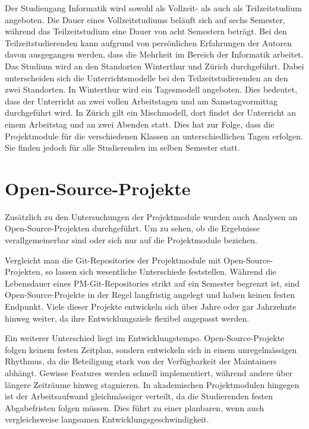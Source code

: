 Der Studiengang Informatik wird sowohl als Vollzeit- als auch als Teilzeitstudium angeboten. Die Dauer eines Vollzeitstudiums beläuft sich auf sechs Semester, während das Teilzeitstudium eine Dauer von acht Semestern beträgt. Bei den Teilzeitstudierenden kann aufgrund von persönlichen Erfahrungen der Autoren davon ausgegangen werden, dass die Mehrheit im Bereich der Informatik arbeitet. Das Studium wird an den Standorten Winterthur und Zürich durchgeführt. Dabei unterscheiden sich die Unterrichtsmodelle bei den Teilzeitstudierenden an den zwei Standorten. In Winterthur wird ein Tagesmodell angeboten. Dies bedeutet, dass der Unterricht an zwei vollen Arbeitstagen und am Samstagvormittag durchgeführt wird. In Zürich gilt ein Mischmodell, dort findet der Unterricht an einem Arbeitstag und an zwei Abenden statt. Dies hat zur Folge, dass die Projektmodule für die verschiedenen Klassen an unterschiedlichen Tagen erfolgen. Sie finden jedoch für alle Studierenden im selben Semester statt. \parencite{noauthor_bachelorstudium_nodate}\parencite{noauthor_teilzeitstudium_nodate}

\section{Open-Source-Projekte}
\label{sec:OpenSourceProjekte}
Zusätzlich zu den Untersuchungen der Projektmodule wurden auch Analysen an Open-Source-Projekten durchgeführt. Um zu sehen, ob die Ergebnisse verallgemeinerbar sind oder sich nur auf die Projektmodule beziehen.

Vergleicht man die Git-Repositories der Projektmodule mit Open-Source-Projekten, so lassen sich wesentliche Unterschiede feststellen. Während die Lebensdauer eines PM-Git-Repositories strikt auf ein Semester begrenzt ist, sind Open-Source-Projekte in der Regel langfristig angelegt und haben keinen festen Endpunkt. Viele dieser Projekte entwickeln sich über Jahre oder gar Jahrzehnte hinweg weiter, da ihre Entwicklungsziele flexibel angepasst werden.

Ein weiterer Unterschied liegt im Entwicklungstempo. Open-Source-Projekte folgen keinem festen Zeitplan, sondern entwickeln sich in einem unregelmässigen Rhythmus, da die Beteiligung stark von der Verfügbarkeit der Maintainers abhängt. Gewisse Features werden schnell implementiert, während andere über längere Zeiträume hinweg stagnieren. In akademischen Projektmodulen hingegen ist der Arbeitsaufwand gleichmässiger verteilt, da die Studierenden festen Abgabefristen folgen müssen. Dies führt zu einer planbaren, wenn auch vergleichsweise langsamen Entwicklungsgeschwindigkeit.


